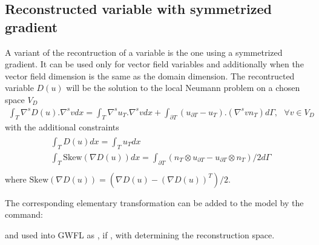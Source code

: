 \documentclass[a4paper,11pt,english]{sphinxmanual}
\begin{document}
\subsection{Reconstructed variable with symmetrized gradient}
\label{\detokenize{userdoc/hho:reconstructed-variable-with-symmetrized-gradient}}
A variant of the recontruction of a variable is the one using a symmetrized gradient. It can be used only for vector field variables and additionally when the vector field dimension is the same as the domain dimension. The recontructed variable \(D(u)\) will be the solution to the local Neumann problem on a chosen space \(V_D\)
\begin{equation*}
\begin{split}\int_T \nabla^s D(u). \nabla^s v dx = \int_T \nabla^s u_T . \nabla^s v dx + \int_{\partial T} (u_{\partial T} - u_{T}).(\nabla^s v n_T) d\Gamma, ~~~ \forall v \in V_D\end{split}
\end{equation*}
with the additional constraints
\begin{align*}\!\begin{aligned}
& \int_T D(u) dx = \int_T u_T dx\\
&\int_T \mbox{Skew}(\nabla D(u)) dx = \int_{\partial T} (n_T \otimes u_{\partial T} - u_{\partial T} \otimes n_T)/2 d\Gamma\\
\end{aligned}\end{align*}
where \(\mbox{Skew}(\nabla D(u)) = (\nabla D(u) - (\nabla D(u))^T)/2\).

The corresponding elementary transformation can be added to the model by the command:

\begin{sphinxVerbatim}[commandchars=\\\{\}]
 
\end{sphinxVerbatim}

and used into GWFL as , if , with  determining the reconstruction space.
\end{document}

